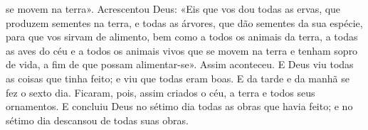\begin{paracol}{2}
{se movem na terra». Acrescentou Deus: «Eis que vos dou todas as ervas, que produzem sementes na terra, e todas as árvores, que dão sementes da sua espécie, para que vos sirvam de alimento, bem como a todos os animais da terra, a todas as aves do céu e a todos os animais vivos que se movem na terra e tenham sopro de vida, a fim de que possam alimentar-se». Assim aconteceu. E Deus viu todas as coisas que tinha feito; e viu que todas eram boas. E da tarde e da manhã se fez o sexto dia. Ficaram, pois, assim criados o céu, a terra e todos seus ornamentos. E concluiu Deus no sétimo dia todas as obras que havia feito; e no sétimo dia descansou de todas suas obras.
}\switchcolumn*{}\switchcolumn{}\switchcolumn*{}\switchcolumn{}\switchcolumn*{}\switchcolumn{}\switchcolumn*{}\switchcolumn{}\end{paracol}

